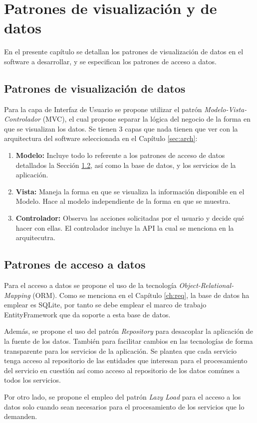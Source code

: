 \chapter{Patrones de visualización y de datos}

En el presente capítulo se detallan los patrones de visualización de datos en el software a desarrollar, y se especifican los patrones de acceso a datos.

\section{Patrones de visualización de datos}\label{sec:vis}

Para la capa de Interfaz de Usuario se propone utilizar el patrón \textit{Modelo-Vista-Controlador} (MVC), el cual propone separar la lógica del negocio de la forma en que se visualizan los datos. Se tienen 3 capas que nada tienen que ver con la arquitectura del software seleccionada en el Capítulo \ref{sec:arch}:

\begin{enumerate}
    \item \textbf{Modelo:} Incluye todo lo referente a los patrones de acceso de datos detallados la Sección \ref{sec:data}, así como la base de datos, y los servicios de la aplicación.
    \item \textbf{Vista:} Maneja la forma en que se visualiza la información disponible en el Modelo. Hace al modelo independiente de la forma en que se muestra.
    \item \textbf{Controlador:} Observa las acciones solicitadas por el usuario y decide qué hacer con ellas. El controlador incluye la API la cual se menciona en la arquitecutra.
\end{enumerate}

\section{Patrones de acceso a datos}\label{sec:data}

Para el acceso a datos se propone el uso de la tecnología \textit{Object-Relational-Mapping} (ORM). Como se menciona en el Capítulo \ref{ch:req}, la base de datos ha emplear es SQLite, por tanto se debe emplear el marco de trabajo EntityFramework que da soporte a esta base de datos.

Además, se propone el uso del patrón \textit{Repository} para desacoplar la aplicación de la fuente de los datos. También para facilitar cambios en las tecnologías de forma transparente para los servicios de la aplicación. Se plantea que cada servicio tenga acceso al repositorio de las entidades que interesan para el procesamiento del servicio en cuestión así como acceso al repositorio de los datos comúnes a todos los servicios.

Por otro lado, se propone el empleo del patrón \textit{Lazy Load} para el acceso a los datos solo cuando sean necesarios para el procesamiento de los servicios que lo demanden.